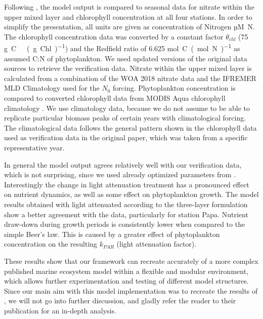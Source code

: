 \documentclass[journal abbreviation, manuscript]{copernicus}
\begin{document}
Following \citet{Anderson2015c}, the model output is compared to seasonal data for nitrate within the upper mixed layer and chlorophyll concentration at all four stations. In order to simplify the presentation, all units are given as concentration of Nitrogen \unit{µM N}. The chlorophyll concentration data was converted by a constant factor $\theta_{chl}$ (75 \unit{g C \ (g Chl)^{−1}}) and the Redfield ratio of 6.625 \unit{mol C (mol N)^{-1}} as assumed C:N of phytoplankton. We used updated versions of the original data sources to retrieve the verification data. Nitrate within the upper mixed layer is calculated from a combination of the WOA 2018 nitrate data and the IFREMER MLD Climatology used for the $N_0$ forcing. Phytoplankton concentration is compared to converted chlorophyll data from MODIS Aqua chlorophyll climatology \citep{NASAGoddardSpaceFlightCenterOceanEcologyLaboratoryOceanBiologyProcessingGroup}. We use climatology data, because we do not assume to be able to replicate particular biomass peaks of certain years with climatological forcing. The climatological data follows the general pattern shown in the chlorophyll data used as verification data in the original paper, which was taken from a specific representative year.

In general the model output agrees relatively well with our verification data, which is not surprising, since we used already optimized parameters from \citet{Anderson2015c}. 
Interestingly the change in light attenuation treatment has a pronounced effect on nutrient dynamics, as well as some effect on phytoplankton growth. The model results obtained with light attenuated according to the three-layer formulation show a better agreement with the data, particularly for station Papa. Nutrient draw-down during growth periods is consistently lower when compared to the simple Beer's law. This is caused by a greater effect of phytoplankton concentration on the resulting $k_{PAR}$ (light attenuation factor).

These results show that our framework can recreate accurately of a more complex published marine ecosystem model within a flexible and modular environment, which allows further experimentation and testing of different model structures.
Since our main aim with this model implementation was to recreate the results of \citet{Anderson2015c}, we will not go into further discussion, and gladly refer the reader to their publication for an in-depth analysis.
\end{document}
